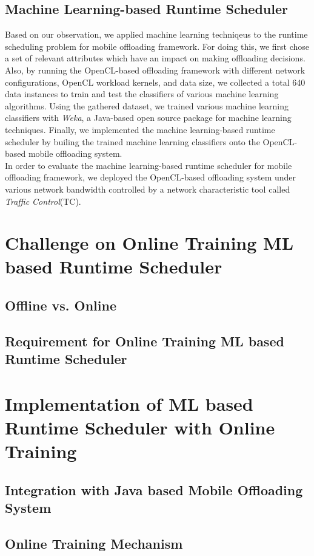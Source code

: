 \documentclass[10pt, conference, compsocconf]{IEEEtran}
\begin{document}
\subsection{Machine Learning-based Runtime Scheduler}
%
Based on our observation, we applied machine learning techniqeus to the
runtime scheduling problem for mobile offloading framework.
%
For doing this, we first chose a set of relevant attributes which have
an impact on making offloading decisions.
%
Also, by running the OpenCL-based offloading framework with different
network configurations, OpenCL workload kernels, and data size, we
collected a total 640 data instances to train and test the classifiers
of various machine learning algorithms.
%
Using the gathered dataset, we trained various machine learning
classifiers with \textit{Weka}, a Java-based open source package for
machine learning techniques.
%
Finally, we implemented the machine learning-based runtime scheduler by
builing the trained machine learning classifiers onto the
OpenCL-based mobile offloading system.\\
%
\indent In order to evaluate the machine learning-based runtime
scheduler for mobile offloading framework, we deployed the OpenCL-based
offloading system under various network bandwidth controlled by a
network characteristic tool called \textit{Traffic Control}(TC).  
%
\section{Challenge on Online Training ML based Runtime Scheduler}
%
\subsection{Offline vs. Online}
%
\subsection{Requirement for Online Training ML based Runtime Scheduler}
%
\section{Implementation of ML based Runtime Scheduler with Online
Training}
%
\subsection{Integration with Java based Mobile Offloading System}
%
\subsection{Online Training Mechanism}
%
\end{document}
